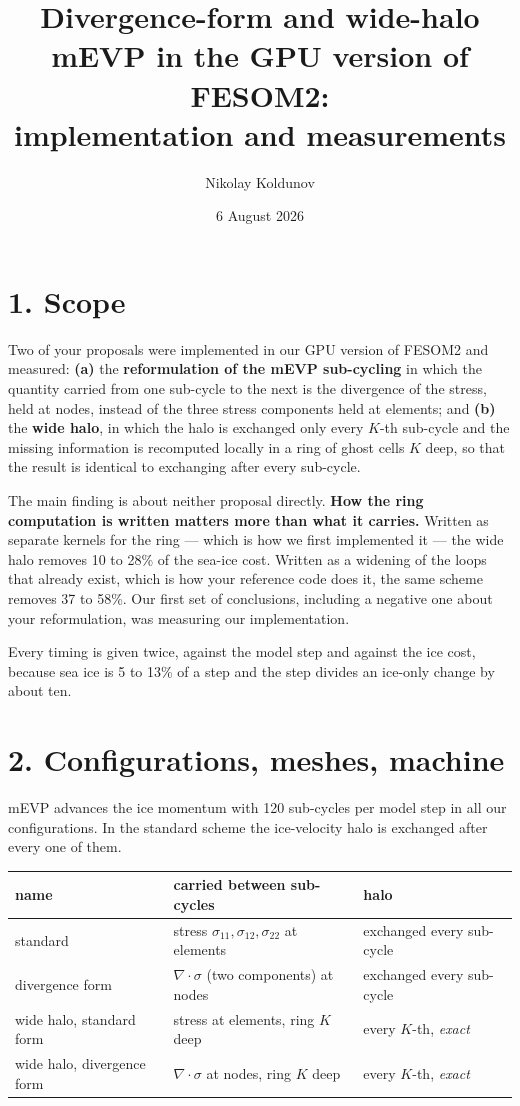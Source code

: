 \documentclass[11pt,a4paper]{article}
\title{\vspace{-1.7cm}\large Divergence-form and wide-halo mEVP in the GPU version of FESOM2:\\
implementation and measurements}
\author{\normalsize Nikolay Koldunov}
\date{\normalsize 6 August 2026}
\begin{document}
\maketitle
\vspace{-1.1cm}

\section*{1. Scope}

Two of your proposals were implemented in our GPU version of FESOM2 and measured:
\textbf{(a)} the \textbf{reformulation of the mEVP sub-cycling} in which the quantity carried from
one sub-cycle to the next is the divergence of the stress, held at nodes, instead of the three
stress components held at elements; and \textbf{(b)} the \textbf{wide halo}, in which the halo is
exchanged only every $K$-th sub-cycle and the missing information is recomputed locally in a ring
of ghost cells $K$ deep, so that the result is identical to exchanging after every sub-cycle.

The main finding is about neither proposal directly. \textbf{How the ring computation is written
matters more than what it carries.} Written as separate kernels for the ring --- which is how we
first implemented it --- the wide halo removes 10 to 28\% of the sea-ice cost. Written as a
widening of the loops that already exist, which is how your reference code does it, the same
scheme removes 37 to 58\%. Our first set of conclusions, including a negative one about your
reformulation, was measuring our implementation.

Every timing is given twice, against the model step and against the ice cost, because sea ice is
5 to 13\% of a step and the step divides an ice-only change by about ten.

\section*{2. Configurations, meshes, machine}

mEVP advances the ice momentum with 120 sub-cycles per model step in all our configurations. In
the standard scheme the ice-velocity halo is exchanged after every one of them.

\begin{center}\small
\begin{tabular}{@{}lll@{}}
\toprule
\textbf{name} & \textbf{carried between sub-cycles} & \textbf{halo} \\
\midrule
standard & stress $\sigma_{11},\sigma_{12},\sigma_{22}$ at elements & exchanged every sub-cycle \\
divergence form & $\nabla\!\cdot\!\sigma$ (two components) at nodes & exchanged every sub-cycle \\
wide halo, standard form & stress at elements, ring $K$ deep & every $K$-th, \emph{exact} \\
wide halo, divergence form & $\nabla\!\cdot\!\sigma$ at nodes, ring $K$ deep & every $K$-th, \emph{exact} \\
\bottomrule
\end{tabular}
\end{center}
\end{document}
